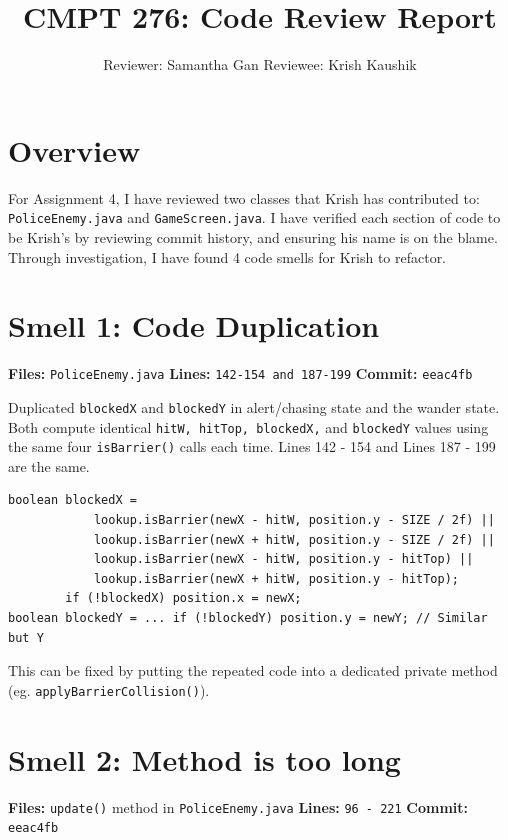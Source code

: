 \documentclass[10pt]{article}
\title{\vspace{-1cm}\textbf{CMPT 276: Code Review Report}\vspace{-0.5cm}}
\author{Reviewer: Samantha Gan \quad Reviewee: Krish Kaushik}
\date{}
\begin{document}
\maketitle
\vspace{-1cm}

\section*{Overview}

For Assignment 4, I have reviewed two classes that Krish has contributed to: \texttt{PoliceEnemy.java} and \texttt{GameScreen.java}. I have verified each section of code to be Krish's by reviewing commit history, and ensuring his name is on the blame. Through investigation, I have found 4 code smells for Krish to refactor.


\section{Smell 1: Code Duplication}

\textbf{Files:} \texttt{PoliceEnemy.java} \quad
\textbf{Lines:} \texttt{142-154 and 187-199} \quad
\textbf{Commit:} \texttt{eeac4fb}

Duplicated \texttt{blockedX} and \texttt{blockedY} in alert/chasing state and the wander state. Both compute identical \texttt{hitW, hitTop, blockedX,} and \texttt{blockedY} values using the same four \texttt{isBarrier()} calls each time. 
Lines 142 - 154 and Lines 187 - 199 are the same.

\begin{lstlisting}
boolean blockedX =
            lookup.isBarrier(newX - hitW, position.y - SIZE / 2f) ||
            lookup.isBarrier(newX + hitW, position.y - SIZE / 2f) ||
            lookup.isBarrier(newX - hitW, position.y - hitTop) ||
            lookup.isBarrier(newX + hitW, position.y - hitTop);
        if (!blockedX) position.x = newX;
boolean blockedY = ... if (!blockedY) position.y = newY; // Similar but Y
\end{lstlisting}

This can be fixed by putting the repeated code into a dedicated private method (eg. \texttt{applyBarrierCollision()}).

\section{Smell 2: Method is too long}

\textbf{Files:} \texttt{update()} method in \texttt{PoliceEnemy.java} \quad
\textbf{Lines:} \texttt{96 - 221} \quad
\textbf{Commit:} \texttt{eeac4fb}
\end{document}
